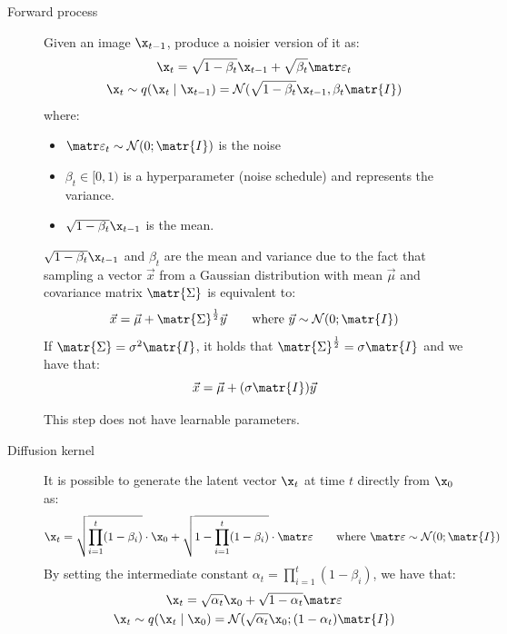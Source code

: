 \begin{description}
    \item[Forward process] 
        Given an image $\x_{t-1}$, produce a noisier version of it as:
        \[ 
            \begin{gathered}
                \x_t = \sqrt{1-\beta_t} \x_{t-1} + \sqrt{\beta_t}\noise_t \\
                \x_t \sim q(\x_t \mid \x_{t-1}) = \mathcal{N}(\sqrt{1-\beta_t}\x_{t-1}, \beta_t\matr{I})
            \end{gathered}
        \]
        where:
        \begin{itemize}
            \item $\noise_t \sim \mathcal{N}(0; \matr{I})$ is the noise
            \item $\beta_t \in [0,1)$ is a hyperparameter (noise schedule) and represents the variance.
            \item $\sqrt{1-\beta_t} \x_{t-1}$ is the mean.
        \end{itemize}

        \begin{remark}
            $\sqrt{1-\beta_t} \x_{t-1}$ and $\beta_t$ are the mean and variance due to the fact that sampling a vector $\vec{x}$ from a Gaussian distribution with mean $\vec{\mu}$ and covariance matrix $\matr{\Sigma}$ is equivalent to:
            \[ \vec{x} = \vec{\mu} + \matr{\Sigma}^{\frac{1}{2}}\vec{y} \qquad \text{where } \vec{y} \sim \mathcal{N}(0; \matr{I}) \]
            If $\matr{\Sigma} = \sigma^2\matr{I}$, it holds that $\matr{\Sigma}^{\frac{1}{2}} = \sigma \matr{I}$ and we have that:
            \[ \vec{x} = \vec{\mu} + (\sigma\matr{I})\vec{y} \]
        \end{remark}

        \begin{remark}
            This step does not have learnable parameters.
        \end{remark}

    \item[Diffusion kernel] 
        It is possible to generate the latent vector $\x_t$ at time $t$ directly from $\x_0$ as:
        \[ \x_t = \sqrt{\prod_{i=1}^{t}(1-\beta_i)} \cdot \x_0 + \sqrt{1-\prod_{i=1}^{t}(1-\beta_i)} \cdot \noise \qquad \text{where } \noise \sim \mathcal{N}(0; \matr{I}) \]
        By setting the intermediate constant $\alpha_t = \prod_{i=1}^{t}(1-\beta_i)$, we have that:
        \[ 
            \begin{gathered}
                \x_t = \sqrt{\alpha_t} \x_0 + \sqrt{1-\alpha_t}\noise \\
                \x_t \sim q(\x_t \mid \x_0) = \mathcal{N}(\sqrt{\alpha_t}\x_0; (1-\alpha_t)\matr{I})
            \end{gathered}
        \]


\end{description}
